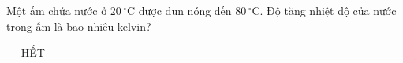 	\begin{ex}%
		Một ấm chứa nước ở $20\,^\circ\text{C}$ được đun nóng đến $80\,^\circ\text{C}$. Độ tăng nhiệt độ của nước trong ấm là bao nhiêu kelvin?
		\par
	\end{ex}

	\centerline{--- HẾT ---}


